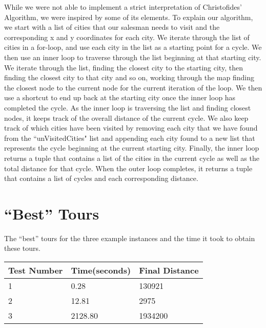 \documentclass[11pt,letterpaper]{article}
\begin{document}
While we were not able to implement a strict interpretation of Christofides' Algorithm, we were inspired by some of its elements. To explain our algorithm, we start with a list of cities that our salesman needs to visit and the corresponding x and y coordinates for each city. We iterate through the list of cities in a for-loop, and use each city in the list as a starting point for a cycle. We then use an inner loop to traverse through the list beginning at that starting city. We iterate through the list, finding the closest city to the starting city, then finding the closest city to that city and so on, working through the map finding the closest node to the current node for the current iteration of the loop. We then use a shortcut to end up back at the starting city once the inner loop has completed the cycle. As the inner loop is traversing the list and finding closest nodes, it keeps track of the overall distance of the current cycle. We also keep track of which cities have been visited by removing each city that we have found from the ``unVisitedCities" list and appending each city found to a new list that represents the cycle beginning at the current starting city.  Finally, the inner loop returns a tuple that contains a list of the cities in the current cycle as well as the total distance for that cycle. When the outer loop completes, it returns a tuple that contains a list of cycles and each corresponding distance.\vspace{8pt}

\section*{``Best'' Tours}
The ``best'' tours for the three example instances and the time it took to obtain these tours.
\begin{tabular}{| l | l | l |}
	\hline
	Test Number & Time(seconds) & Final Distance \\ \hline
	1 & 0.28 & 130921 \\ \hline
	2 & 12.81 & 2975 \\ \hline
	3 & 2128.80 & 1934200 \\ \hline
\end{tabular} \\
\end{document}
